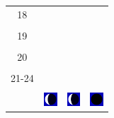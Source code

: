 \documentclass[twoside, a4paper,12pt, tikz]{scrartcl}
\begin{document}
\begin{tabularx}{\linewidth}{|c|X|X|X|}
        &   &       &    \\
      \hline
      18&   &       &    \\
        &   &       &    \\
      \hline
      19&   &       &    \\
        &   &       &    \\
      \hline
      20&   &       &    \\
        &   &       &    \\
      \hline
      21-24&   &       &    \\
        &   &       &    \\
      \hline  
      & \vspace{0.01cm} \centerline{\includegraphics[width=0.5cm]{moon_phases/Moon_phase_7.svg.png}} \vspace{0.1cm} & \vspace{0.01cm} \centerline{\includegraphics[width=0.5cm]{moon_phases/Moon_phase_7.svg.png}} \vspace{0.1cm} & \vspace{0.01cm} \centerline{\includegraphics[width=0.5cm]{moon_phases/Moon_phase_0.svg.png}} \vspace{0.1cm}\\
      \hline   
    \end{tabularx}




    \newpage

        \noindent
\end{document}
